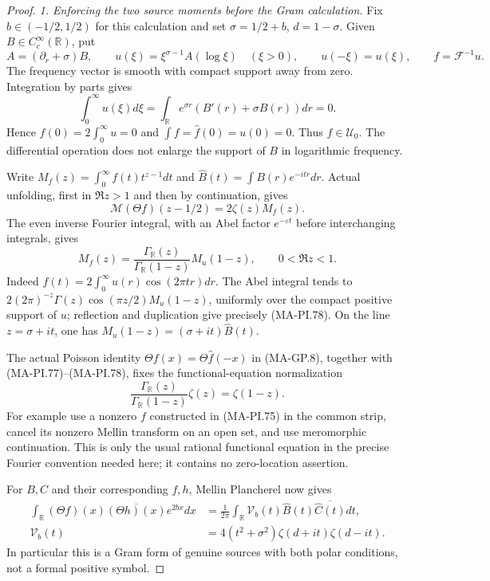 \begin{proof}
\emph{1. Enforcing the two source moments before the Gram calculation.}
Fix $b\in(-1/2,1/2)$ for this calculation and set
$\sigma=1/2+b$, $d=1-\sigma$.
Given $B\in C_c^\infty(\mathbb R)$, put
\[
 A=(\partial_r+\sigma)B,\qquad
 u(\xi)=\xi^{\sigma-1}A(\log\xi)\quad(\xi>0),
 \qquad u(-\xi)=u(\xi),\qquad f=\mathcal F^{-1}u.
 \tag{MA-PI.75}
\]
The frequency vector is smooth with compact support away from
zero. Integration by parts gives
\[
 \int_0^\infty u(\xi)d\xi
       =\int_{\mathbb R}e^{\sigma r}
                  (B'(r)+\sigma B(r))dr=0.
 \tag{MA-PI.76}
\]
Hence $f(0)=2\int_0^\infty u=0$ and
$\int f=\widehat f(0)=u(0)=0$. Thus $f\in\mathcal U_0$.
The differential operation does not enlarge the support of
$B$ in logarithmic frequency.

Write $M_f(z)=\int_0^\infty f(t)t^{z-1}dt$ and
$\widehat B(t)=\int B(r)e^{-itr}dr$. Actual unfolding, first
in $\Re z>1$ and then by continuation, gives
\[
 \mathcal M(\Theta f)(z-1/2)=2\zeta(z)M_f(z).
 \tag{MA-PI.77}
\]
The even inverse Fourier integral, with an Abel factor
$e^{-\varepsilon t}$ before interchanging integrals, gives
\[
 M_f(z)=\frac{\Gamma_{\mathbb R}(z)}
                    {\Gamma_{\mathbb R}(1-z)}M_u(1-z),
                         \qquad0<\Re z<1.
 \tag{MA-PI.78}
\]
Indeed $f(t)=2\int_0^\infty u(r)\cos(2\pi tr)dr$.
The Abel integral tends to
$2(2\pi)^{-z}\Gamma(z)\cos(\pi z/2)M_u(1-z)$,
uniformly over the compact positive support of $u$;
reflection and duplication give precisely (MA-PI.78).
On the line $z=\sigma+it$, one has
$M_u(1-z)=(\sigma+it)\widehat B(t)$.

The actual Poisson identity $\Theta f(x)=\Theta\widehat f(-x)$
in (MA-GP.8), together with (MA-PI.77)--(MA-PI.78), fixes
the functional-equation normalization
\[
 \frac{\Gamma_{\mathbb R}(z)}{\Gamma_{\mathbb R}(1-z)}
                  \zeta(z)=\zeta(1-z).
 \tag{MA-PI.79}
\]
For example use a nonzero $f$ constructed in (MA-PI.75)
in the common strip, cancel its nonzero Mellin transform on an open set,
and use meromorphic continuation. This is only the usual
rational functional equation in the precise Fourier convention
needed here; it contains no zero-location assertion.

For $B,C$ and their corresponding $f,h$, Mellin Plancherel now gives
\[
 \begin{aligned}
 \int_{\mathbb R}(\Theta f)(x)
       \overline{(\Theta h)(x)}e^{2bx}dx
    &=\frac1{2\pi}\int_{\mathbb R}
             \mathscr V_b(t)\widehat B(t)
                               \overline{\widehat C(t)}dt,\\
 \mathscr V_b(t)&=4(t^2+\sigma^2)
                       \zeta(d+it)\zeta(d-it).
 \end{aligned}
 \tag{MA-PI.80}
\]
In particular this is a Gram form of genuine sources with
both polar conditions, not a formal positive symbol.


\end{proof}
